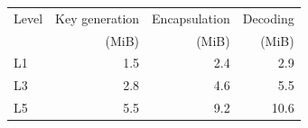 \begin{tabular}{lrrr}
\toprule
Level & Key generation & Encapsulation & Decoding\\
 & (MiB) & (MiB) & (MiB)\\
\midrule
L1 & 1.5 & 2.4 & 2.9\\
L3 & 2.8 & 4.6 & 5.5\\
L5 & 5.5 & 9.2 & 10.6\\
\bottomrule
\end{tabular}
